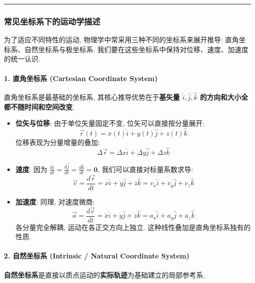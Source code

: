 \documentclass[
  a4paper,
]{ctexrep}
\begin{document}
\begin{center}\rule{0.5\linewidth}{0.5pt}\end{center}

\subsubsection{常见坐标系下的运动学描述}\label{ux5e38ux89c1ux5750ux6807ux7cfbux4e0bux7684ux8fd0ux52a8ux5b66ux63cfux8ff0}

为了适应不同特性的运动, 物理学中常采用三种不同的坐标系来展开推导:
直角坐标系、自然坐标系与极坐标系.
我们要在这些坐标系中保持对位移、速度、加速度的统一认识.

\paragraph{1. 直角坐标系 (Cartesian Coordinate
System)}\label{ux76f4ux89d2ux5750ux6807ux7cfb-cartesian-coordinate-system}

直角坐标系是最基础的坐标系, 其核心推导优势在于\textbf{基矢量
\(\hat{i}, \hat{j}, \hat{k}\) 的方向和大小全都不随时间和空间改变}.

\begin{itemize}
\item
  \textbf{位矢与位移}: 由于单位矢量固定不变, 位矢可以直接按分量展开:
  \[\vec{r}(t) = x(t)\hat{i} + y(t)\hat{j} + z(t)\hat{k}\]
  位移表现为分量增量的叠加:
  \[\Delta \vec{r} = \Delta x\hat{i} + \Delta y\hat{j} + \Delta z\hat{k}\]
\item
  \textbf{速度}: 因为
  \(\frac{d\hat{i}}{dt} = \frac{d\hat{j}}{dt} = \frac{d\hat{k}}{dt} = \textbf{0}\),
  我们可以直接对标量系数求导:
  \[\vec{v} = \frac{d\vec{r}}{dt} = \dot{x}\hat{i} + \dot{y}\hat{j} + \dot{z}\hat{k} = v_x\hat{i} + v_y\hat{j} + v_z\hat{k}\]
\item
  \textbf{加速度}: 同理, 对速度微商:
  \[\vec{a} = \frac{d\vec{v}}{dt} = \ddot{x}\hat{i} + \ddot{y}\hat{j} + \ddot{z}\hat{k} = a_x\hat{i} + a_y\hat{j} + a_z\hat{k}\]
  各分量完全解耦, 运动在各正交方向上独立.
  这种线性叠加是直角坐标系独有的性质.
\end{itemize}

\paragraph{2. 自然坐标系 (Intrinsic / Natural Coordinate
System)}\label{ux81eaux7136ux5750ux6807ux7cfb-intrinsic-natural-coordinate-system}

\textbf{自然坐标系}是直接以质点运动的\textbf{实际轨迹}为基础建立的局部参考系.
\end{document}
